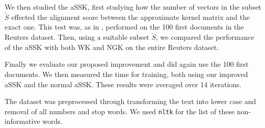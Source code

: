 We then studied the aSSK, first studying how the number of vectors in the subset $ \tilde{S} $ effected the alignment score between the approximate kernel matrix and the exact one. This test was, as in \cite{lodhi}, performed on the 100 first documents in the Reuters dataset. Then, using a suitable subset $ \tilde{S} $, we compared the performance of the aSSK with both WK and NGK on the entire Reuters dataset. 

Finally we evaluate our proposed improvement and did again use the 100 first documents. We then measured the time for training, both using our improved aSSK and the normal aSSK. These results were averaged over 14 iterations.

The dataset was preprocessed through transforming the text into lower case and removal of all numbers and stop words. We used \texttt{nltk} for the list of these non-informative words.


